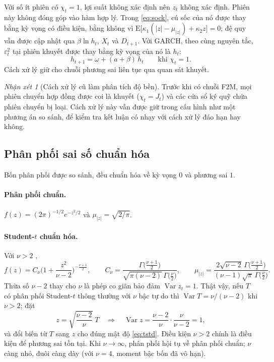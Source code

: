 \documentclass[12pt,a4paper]{article}
\theoremstyle{definition}
\theoremstyle{remark}
\newtheorem{nhanxet}{Nhận xét}[section]
\newcommand{\E}{\mathrm{E}}
\newcommand{\Var}{\operatorname{Var}}
\begin{document}
Với số ít phiên có $\chi_t=1$, lợi suất không xác định nên $z_t$ không xác định. Phiên này không đóng góp vào hàm hợp lý. Trong \eqref{eq:sock}, cú sốc của nó được thay bằng kỳ vọng có điều kiện, bằng không vì $\E\big[\kappa_1(|z|-\mu_{|z|})+\kappa_2 z\big]=0$; đệ quy vẫn được cập nhật qua $\beta\ln h_t$, $X_t$ và $D_{t+1}$. Với GARCH, theo cùng nguyên tắc, $\varepsilon_t^2$ tại phiên khuyết được thay bằng kỳ vọng của nó là $h_t$:
\begin{equation}
h_{t+1}=\omega+(a+\beta)\,h_t\qquad\text{khi } \chi_t=1 .
\end{equation}
Cách xử lý giữ cho chuỗi phương sai liên tục qua quan sát khuyết.

\begin{nhanxet}[Cách xử lý cũ làm phân tích độ bền]
Trước khi có chuỗi F2M, mọi phiên chuyển hợp đồng được coi là khuyết ($\chi_t=J_t$) và các cửa sổ ký quỹ chứa phiên chuyển bị loại. Cách xử lý này vẫn được giữ trong cấu hình như một phương án so sánh, để kiểm tra kết luận có nhạy với cách xử lý đáo hạn hay không.
\end{nhanxet}

\subsection{Phân phối sai số chuẩn hóa}\label{sec:phanphoi}

Bốn phân phối được so sánh, đều chuẩn hóa về kỳ vọng $0$ và phương sai $1$.

\paragraph{Phân phối chuẩn.} $f(z)=(2\pi)^{-1/2}e^{-z^2/2}$ và $\mu_{|z|}=\sqrt{2/\pi}$.

\paragraph{Student-$t$ chuẩn hóa.} Với $\nu>2$ \cite{bollerslev1987},
\begin{equation}\label{eq:tstd}
f(z)=C_\nu\Big(1+\frac{z^2}{\nu-2}\Big)^{-\frac{\nu+1}{2}},\qquad
C_\nu=\frac{\Gamma\big(\frac{\nu+1}{2}\big)}{\sqrt{\pi(\nu-2)}\,\Gamma\big(\frac{\nu}{2}\big)},\qquad
\mu_{|z|}=\frac{2\sqrt{\nu-2}\,\Gamma\big(\frac{\nu+1}{2}\big)}{(\nu-1)\sqrt{\pi}\,\Gamma\big(\frac{\nu}{2}\big)} .
\end{equation}
Thừa số $\nu-2$ thay cho $\nu$ là phép co giãn bảo đảm $\Var z_t=1$. Thật vậy, nếu $T$ có phân phối Student-$t$ thông thường với $\nu$ bậc tự do thì $\Var T=\nu/(\nu-2)$ khi $\nu>2$; đặt
\begin{equation*}
z=\sqrt{\frac{\nu-2}{\nu}}\;T\quad\Longrightarrow\quad\Var z=\frac{\nu-2}{\nu}\cdot\frac{\nu}{\nu-2}=1,
\end{equation*}
và đổi biến từ $T$ sang $z$ cho đúng mật độ \eqref{eq:tstd}. Điều kiện $\nu>2$ chính là điều kiện để phương sai tồn tại. Khi $\nu\to\infty$, phân phối hội tụ về phân phối chuẩn; $\nu$ càng nhỏ, đuôi càng dày (với $\nu=4$, moment bậc bốn đã vô hạn).
\end{document}
